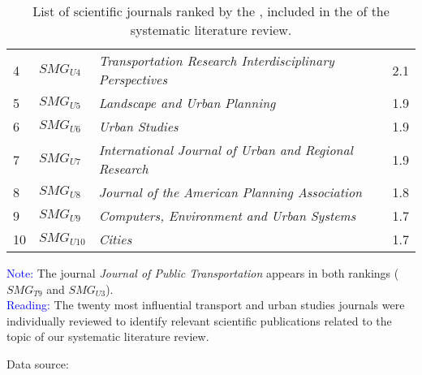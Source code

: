 \begin{table}[h!]
{\begin{tabular}{p{}p{}p{}p{}}
\small{4} & \small{\(SMG_{U4}\)} & \small{\textsl{Transportation Research Interdisciplinary Perspectives}} & \small{2.1}\\
\small{5} & \small{\(SMG_{U5}\)} & \small{\textsl{Landscape and Urban Planning}} & \small{1.9}\\
\small{6} & \small{\(SMG_{U6}\)} & \small{\textsl{Urban Studies}} & \small{1.9}\\
\small{7} & \small{\(SMG_{U7}\)} & \small{\textsl{International Journal of Urban and Regional Research}} & \small{1.9}\\
\small{8} & \small{\(SMG_{U8}\)} & \small{\textsl{Journal of the American Planning Association}} & \small{1.8}\\
\small{9} & \small{\(SMG_{U9}\)} & \small{\textsl{Computers, Environment and Urban Systems}} & \small{1.7}\\
\small{10} & \small{\(SMG_{U10}\)} & \small{\textsl{Cities}} & \small{1.7}\\
        \hline
        \end{tabular}}
    \caption{List of scientific journals ranked by the , included in the  of the systematic literature review.}
    \label{table-chap2:revues-scientifiques-rsl}
        \vspace{5pt}
        \begin{flushleft}\scriptsize{
        \textcolor{blue}{Note:} The journal \textsl{Journal of Public Transportation} appears in both rankings (\(SMG_{T9}\) and \(SMG_{U3}\)).
        \\
        \textcolor{blue}{Reading:} The twenty most influential transport and urban studies journals were individually reviewed to identify relevant scientific publications related to the topic of our systematic literature review.
        }\end{flushleft}
        \begin{flushright}\scriptsize{
        Data source: ~\textcolor{blue}{\autocite{sjr_scimago_2023}}
        }\end{flushright}
        \end{table}